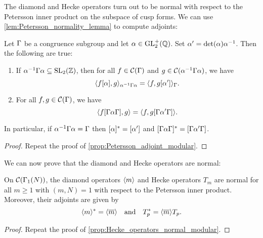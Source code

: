       The diamond and Hecke operators turn out to be normal with respect to the Petersson inner product on the subspace of cusp forms. We can use \cref{lem:Petersson_normality_lemma} to compute adjoints:

      \begin{proposition}\label{prop:Petersson_adjoint_Maass}
        Let $\Gamma$ be a congruence subgroup and let $\alpha \in \mathrm{GL}_{2}^{+}(\mathbb{Q})$. Set $\alpha' = \det(\alpha)\alpha^{-1}$. Then the following are true:
        \begin{enumerate}[label=(\roman*)]
          \item If $\alpha^{-1}\Gamma\alpha \subseteq \mathrm{SL}_{2}(\mathbb{Z})$, then for all $f \in \mathcal{C}(\Gamma)$ and $g \in \mathcal{C}(\alpha^{-1}\Gamma\alpha)$, we have
          \[
            \langle f[\alpha],g\rangle_{\alpha^{-1}\Gamma\alpha} = \langle f,g[\alpha']\rangle_{\Gamma}.
          \]
          \item For all $f,g \in \mathcal{C}(\Gamma)$, we have
          \[
            \langle f[\Gamma\alpha\Gamma],g\rangle = \langle f,g[\Gamma\alpha'\Gamma]\rangle.
          \]
        \end{enumerate}
        In particular, if $\alpha^{-1}\Gamma\alpha = \Gamma$ then $[\alpha]^{\ast} = [\alpha']$ and $[\Gamma\alpha\Gamma]^{\ast} = [\Gamma\alpha'\Gamma]$.   
      \end{proposition}
      \begin{proof}
        Repeat the proof of \cref{prop:Petersson_adjoint_modular}.
      \end{proof}

      We can now prove that the diamond and Hecke operators are normal:

      \begin{proposition}\label{prop:Hecke_operators_normal_Maass}
        On $\mathcal{C}(\Gamma_{1}(N))$, the diamond operators $\langle m\rangle$ and Hecke operators $T_{m}$ are normal for all $m \ge 1$ with $(m,N) = 1$ with respect to the Petersson inner product. Moreover, their adjoints are given by
        \[
          \langle m\rangle^{\ast} = \langle\overline{m}\rangle \quad \text{and} \quad T_{p}^{\ast} = \langle\overline{m}\rangle T_{p}.
        \]
      \end{proposition}
      \begin{proof}
        Repeat the proof of \cref{prop:Hecke_operators_normal_modular}.
      \end{proof}

